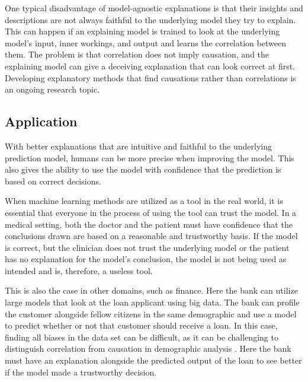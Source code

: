 One typical disadvantage of model-agnostic explanations is that their insights and descriptions are not always faithful to the underlying model they try to explain. This can happen if an explaining model is trained to look at the underlying model's input, inner workings, and output and learns the correlation between them. The problem is that correlation does not imply causation, and the explaining model can give a deceiving explanation that can look correct at first. Developing explanatory methods that find causations rather than correlations is an ongoing research topic.




\subsection{Application}

With better explanations that are intuitive and faithful to the underlying prediction model, humans can be more precise when improving the model. This also gives the ability to use the model with confidence that the prediction is based on correct decisions.


When machine learning methods are utilized as a tool in the real world, it is essential that everyone in the process of using the tool can trust the model. 
In a medical setting, both the doctor and the patient must have confidence that the conclusions drawn are based on a reasonable and trustworthy basis. If the model is correct, but the clinician does not trust the underlying model or the patient has no explanation for the model's conclusion, the model is not being used as intended and is, therefore, a useless tool.

This is also the case in other domains, such as finance. Here the bank can utilize large models that look at the loan applicant using big data. The bank can profile the customer alongside fellow citizens in the same demographic and use a model to predict whether or not that customer should receive a loan. In this case, finding all biases in the data set can be difficult, as it can be challenging to distinguish correlation from causation in demographic analysis \cite{garciaHarmsDemographicBias2019}. Here the bank must have an explanation alongside the predicted output of the loan to see better if the model made a trustworthy decision. 




